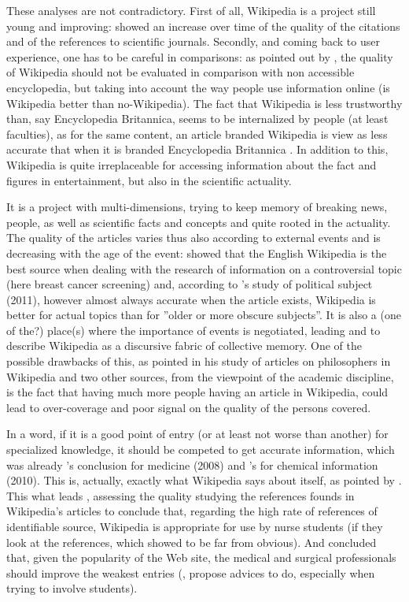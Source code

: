 These analyses are not contradictory. First of all, Wikipedia is a
project still young and improving: \citet{Nielsen07} showed an increase
over time of the quality of the citations and of the references to
scientific journals. Secondly, and coming back to user experience,
one has to be careful in comparisons: as pointed out by \citet{Fallis08},
the quality of Wikipedia should not be evaluated in comparison with
non accessible encyclopedia, but taking into account the way people
use information online (is Wikipedia better than no-Wikipedia). The
fact that Wikipedia is less trustworthy than, say Encyclopedia Britannica,
seems to be internalized by people (at least faculties), as for the
same content, an article branded Wikipedia is view as less accurate
that when it is branded Encyclopedia Britannica \citep{KubiszewskiNoordewierCostanza11}.
In addition to this, Wikipedia is quite irreplaceable for accessing
information about the fact and figures in entertainment, but also
in the scientific actuality. 

It is a project with multi-dimensions, trying to keep memory of breaking
news, people, as well as scientific facts and concepts and quite rooted
in the actuality. The quality of the articles varies thus also according
to external events and is decreasing with the age of the event: \citet{Hjorland10}
showed that the English Wikipedia is the best source when dealing
with the research of information on a controversial topic (here breast
cancer screening) and, according to \citeauthor{Brown11}'s study
of political subject (2011), however almost always accurate when the
article exists, Wikipedia is better for actual topics than for ''older
or more obscure subjects''. It is also a (one of the?) place(s) where
the importance of events is negotiated, leading \citet{Pentzold09}
and \citet{HaiderSundin10} to describe Wikipedia as a discursive
fabric of collective memory. One of the possible drawbacks of this,
as pointed \citet{Elvebakk08} in his study of articles on philosophers
in Wikipedia and two other sources, from the viewpoint of the academic
discipline, is the fact that having much more people having an article
in Wikipedia, could lead to over-coverage and poor signal on the quality
of the persons covered.

In a word, if it is a good point of entry (or at least not worse than
another) for specialized knowledge, it should be competed to get accurate
information, which was already \citeauthor{Clausonetal08}'s conclusion
for medicine (2008) and \citeauthor{Korosec10}'s for chemical information
(2010). This is, actually, exactly what Wikipedia says about itself,
as pointed by \citet[p. 596]{Murley08}. This what leads \citet{Haigh11},
assessing the quality studying the references founds in Wikipedia's
articles to conclude that, regarding the high rate of references of
identifiable source, Wikipedia is appropriate for use by nurse students
(if they look at the references, which \citet{Korosec10} showed to
be far from obvious). And \citet{Devganetal07} concluded that, given
the popularity of the Web site, the medical and surgical professionals
should improve the weakest entries (\citealp{WestWilliamson09}, propose
advices to do, especially when trying to involve students).
